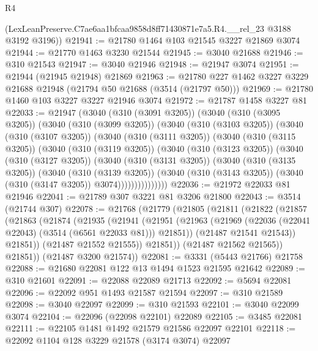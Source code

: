 \begin{lexlean}{R4}
\begin{coremodule}
      (LexLeanPreserve.C7ae6aa1bfcaa9858d8ff71430871e7a5.R4.__rel_23 @3188 @3192 @3196))
@21941 := @21780 @1464 @103 @21545 @3227 @21869 @3074
@21944 := @21770 @1463 @3230 @21544
@21945 := @3040 @21688
@21946 := @310 @21543
@21947 := @3040 @21946
@21948 := @21947 @3074
@21951 := @21944 (@21945 @21948) @21869
@21963 := @21780 @227 @1462 @3227 @3229 @21688 @21948 (@21794 @50 @21688 (@3514 (@21797 @50)))
@21969 := @21780 @1460 @103 @3227 @3227 @21946 @3074
@21972 := @21787 @1458 @3227 @81
@22033 := @21947
    (@3040
      (@310 (@3091 @3205))
      (@3040
        (@310 (@3095 @3205))
        (@3040
          (@310 (@3099 @3205))
          (@3040
            (@310 (@3103 @3205))
            (@3040
              (@310 (@3107 @3205))
              (@3040
                (@310 (@3111 @3205))
                (@3040
                  (@310 (@3115 @3205))
                  (@3040
                    (@310 (@3119 @3205))
                    (@3040
                      (@310 (@3123 @3205))
                      (@3040
                        (@310 (@3127 @3205))
                        (@3040
                          (@310 (@3131 @3205))
                          (@3040
                            (@310 (@3135 @3205))
                            (@3040
                              (@310 (@3139 @3205))
                              (@3040
                                (@310 (@3143 @3205))
                                (@3040 (@310 (@3147 @3205)) @3074)))))))))))))))
@22036 := @21972 @22033 @81 @21946
@22041 := @21789 @307 @3221 @81 @3206 @21800
@22043 := @3514 (@21744 @307)
@22078 := @21768
    (@21779
      (@21805
        (@21811
          (@21822
            (@21857
              (@21863
                (@21874
                  (@21935
                    (@21941
                      (@21951
                        (@21963 (@21969 (@22036 (@22041 @22043) (@3514 (@6561 @22033 @81))) @21851))
                        (@21487 @21541 @21543))
                      @21851))
                  (@21487 @21552 @21555))
                @21851))
            (@21487 @21562 @21565))
          @21851))
      (@21487 @3200 @21574))
@22081 := @3331 (@5443 @21766) @21758
@22088 := @21680 @22081 @122 @13 @1494 @1523 @21595 @21642
@22089 := @310 @21601
@22091 := @22088 @22089 @21713
@22092 := @5694 @22081
@22096 := @22092 @951 @1493 @21587 @21594
@22097 := @310 @21589
@22098 := @3040 @22097
@22099 := @310 @21593
@22101 := @3040 @22099 @3074
@22104 := @22096 (@22098 @22101) @22089
@22105 := @3485 @22081
@22111 := @22105 @1481 @1492 @21579 @21586 @22097 @22101
@22118 := @22092 @1104 @128 @3229 @21578 (@3174 @3074) @22097

\end{coremodule}
\end{lexlean}

